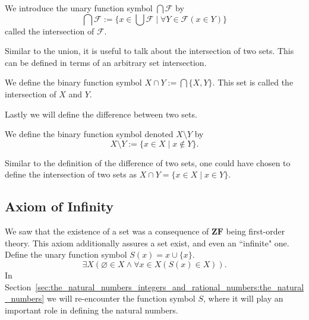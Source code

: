 \documentclass[../main.tex]{subfiles}
\begin{document}
\begin{definition}
    We introduce the unary function symbol $\bigcap\mathcal{F}$ by
    \begin{equation*}
        \bigcap\mathcal{F}:=\{x\in\bigcup\mathcal{F}\mid\forall Y\in\mathcal{F}(x\in Y)\}
    \end{equation*}
    called the intersection of $\mathcal{F}$.
\end{definition}
Similar to the union, it is useful to talk about the intersection of two sets. This can be defined in terms of an arbitrary set intersection.
\begin{definition}
    We define the binary function symbol $X\cap Y:=\bigcap\{X,Y\}$. This set is called the intersection of $X$ and $Y$.
\end{definition}
Lastly we will define the difference between two sets.
\begin{definition}
    We define the binary function symbol denoted $X\setminus Y$ by
    \begin{equation*}
        X\setminus Y:=\{x\in X\mid x\notin Y\}.
    \end{equation*}
\end{definition}
Similar to the definition of the difference of two sets, one could have chosen to define the intersection of two sets as $X\cap Y=\{x\in X\mid x\in Y\}$.

\subsection*{Axiom of Infinity}\label{subsec:zermelo_fraenkel_set_theory:axiom_of_infinity}
We saw that the existence of a set was a consequence of $\mathbf{ZF}$ being first-order theory. This axiom additionally assures a set exist, and even an ``infinite" one. Define the unary function symbol $S(x)=x\cup\{x\}$.
\begin{equation*}
    \exists X(\varnothing\in X\land\forall x\in X(S(x)\in X)).
\end{equation*}
In Section~\ref{sec:the_natural_numbers_integers_and_rational_numbers:the_natural_numbers} we will re-encounter the function symbol $S$, where it will play an important role in defining the natural numbers.
\end{document}

